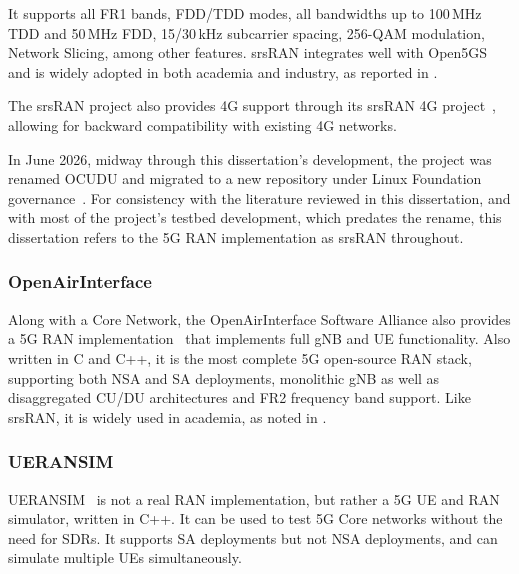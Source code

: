 It supports all FR1 bands, \gls{FDD}/\gls{TDD} modes, all bandwidths up to 100\,MHz \gls{TDD} and 50\,MHz \gls{FDD}, 15/30\,kHz subcarrier spacing, 256-QAM modulation, Network Slicing, among other features. srsRAN integrates well with Open5GS and is widely adopted in both academia and industry, as reported in \cites{horstmann2025open5gcube}{mamushiane2023deploying}{tio2025exploring5g}{vazquez2024maq5g}.

The srsRAN project also provides 4G  support through its srsRAN 4G project~\cite{srsran_4g_repo}, allowing for backward compatibility with existing 4G networks.

In June 2026, midway through this dissertation's development, the project was renamed OCUDU and migrated to a new repository under Linux Foundation governance~\cite{ocudu_project}. For consistency with the literature reviewed in this dissertation, and with most of the project's testbed development, which predates the rename, this dissertation refers to the 5G \gls{RAN} implementation as srsRAN throughout.

\subsubsection{OpenAirInterface}
\label{sec:openairinterface_ran}

Along with a Core Network, the OpenAirInterface Software Alliance also provides a 5G \gls{RAN} implementation~\cite{oai5g_repo} that implements full \gls{gNB} and \gls{UE} functionality. Also written in C and C++, it is the most complete 5G open-source \gls{RAN} stack, supporting both \gls{NSA} and \gls{SA} deployments, monolithic \gls{gNB} as well as disaggregated \gls{CU}/\gls{DU} architectures and FR2 frequency band support. Like srsRAN, it is widely used in academia, as noted in \cites{bonati2025_5gct}{horstmann2025open5gcube}.

\subsubsection{UERANSIM}
\label{sec:ueransim}

UERANSIM~\cite{ueransim_repo} is not a real \gls{RAN} implementation, but rather a 5G \gls{UE} and \gls{RAN} simulator, written in C++. It can be used to test 5G Core networks without the need for \glspl{SDR}. It supports \gls{SA} deployments but not \gls{NSA} deployments, and can simulate multiple \glspl{UE} simultaneously.

